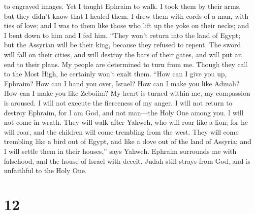to engraved images.  Yet I taught Ephraim to walk. I took
them by their arms, but they didn't know that I healed them.
 I drew them with cords of a man, with ties of love; and I
was to them like those who lift up the yoke on their necks; and I bent
down to him and I fed him.  ``They won't return into the
land of Egypt; but the Assyrian will be their king, because they refused
to repent.  The sword will fall on their cities, and will
destroy the bars of their gates, and will put an end to their plans.
 My people are determined to turn from me. Though they call
to the Most High, he certainly won't exalt them.  ``How can
I give you up, Ephraim? How can I hand you over, Israel? How can I make
you like Admah? How can I make you like Zeboiim? My heart is turned
within me, my compassion is aroused.  I will not execute the
fierceness of my anger. I will not return to destroy Ephraim, for I am
God, and not man---the Holy One among you. I will not come in wrath.
 They will walk after Yahweh, who will roar like a lion;
for he will roar, and the children will come trembling from the west.
 They will come trembling like a bird out of Egypt, and
like a dove out of the land of Assyria; and I will settle them in their
houses,'' says Yahweh.  Ephraim surrounds me with
falsehood, and the house of Israel with deceit. Judah still strays from
God, and is unfaithful to the Holy One.

\hypertarget{section-6}{%
\section{12}\label{section-6}}

